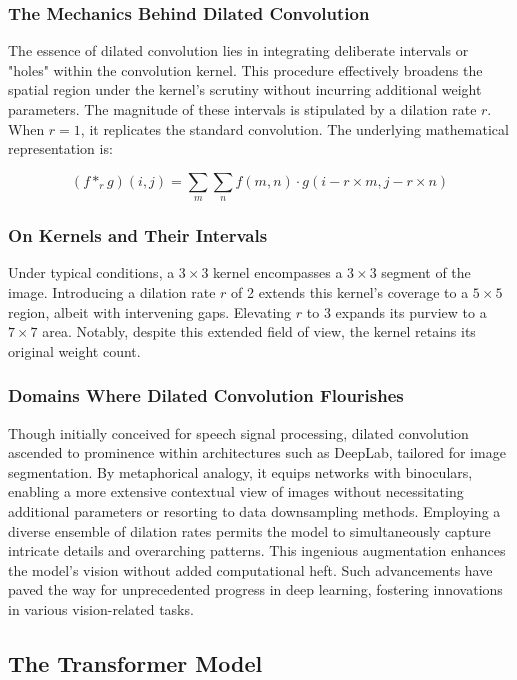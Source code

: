 \documentclass[10pt,twocolumn,letterpaper]{article}
\begin{document}
\subsubsection{The Mechanics Behind Dilated Convolution}

The essence of dilated convolution lies in integrating deliberate intervals or "holes" within the convolution kernel. This procedure effectively broadens the spatial region under the kernel's scrutiny without incurring additional weight parameters. The magnitude of these intervals is stipulated by a dilation rate \( r \). When \( r = 1 \), it replicates the standard convolution. The underlying mathematical representation is:

\[ (f *_{r} g)(i, j) = \sum_{m} \sum_{n} f(m,n) \cdot g(i-r \times m, j-r \times n) \]

\subsubsection{On Kernels and Their Intervals}

Under typical conditions, a \(3 \times 3\) kernel encompasses a \(3 \times 3\) segment of the image. Introducing a dilation rate \( r \) of 2 extends this kernel's coverage to a \(5 \times 5\) region, albeit with intervening gaps. Elevating \( r \) to 3 expands its purview to a \(7 \times 7\) area. Notably, despite this extended field of view, the kernel retains its original weight count.

\subsubsection{Domains Where Dilated Convolution Flourishes}

Though initially conceived for speech signal processing, dilated convolution ascended to prominence within architectures such as DeepLab, tailored for image segmentation. By metaphorical analogy, it equips networks with binoculars, enabling a more extensive contextual view of images without necessitating additional parameters or resorting to data downsampling methods. Employing a diverse ensemble of dilation rates permits the model to simultaneously capture intricate details and overarching patterns. This ingenious augmentation enhances the model's vision without added computational heft. Such advancements have paved the way for unprecedented progress in deep learning, fostering innovations in various vision-related tasks.

\subsection{The Transformer Model}
\end{document}
